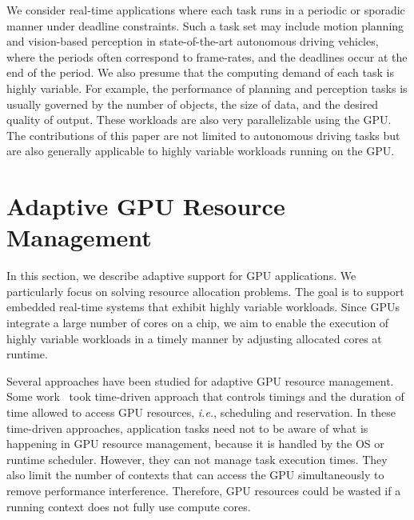 \documentclass{acm_proc_article-sp}
\begin{document}
We consider real-time applications where each task runs in a periodic or
sporadic manner under deadline constraints.
Such a task set may include motion planning and 
vision-based perception in state-of-the-art autonomous driving
vehicles, where the periods often correspond to frame-rates, and the
deadlines occur at the end of the period.
We also presume that the computing demand of each task is highly
variable.
For example, the performance of planning and perception tasks is usually
governed by the number of objects, the size of data, and the desired
quality of output.
These workloads are also very parallelizable using the GPU.
The contributions of this paper are not limited to autonomous driving tasks but
are also generally applicable to highly variable workloads running on the
GPU.

\section{Adaptive GPU Resource Management}
\label{sec:adaptivity_support}

In this section, we describe adaptive support for GPU applications.
We particularly focus on solving resource allocation problems.
The goal is to support embedded real-time systems that exhibit highly variable
workloads.
Since GPUs integrate a large number of cores on a chip, 
we aim to enable the execution of 
highly variable workloads in a timely manner by adjusting
allocated cores at runtime.

Several approaches have been studied for adaptive GPU resource
management.
Some work~\cite{Kato_RTAS11, Kato_RTSS11, Kato_ATC11} took
time-driven approach that controls timings and the duration of time
allowed to access GPU resources, \textit{i.e.}, scheduling and
reservation.
In these time-driven approaches, application tasks need not to be aware
of what is happening in GPU resource management, because it is handled
by the OS or runtime scheduler.
However, they can not manage task execution times.
They also limit the number of contexts that can access the GPU
simultaneously to remove performance interference.
Therefore, GPU resources could be wasted if a running context does not
fully use compute cores.
\end{document}
